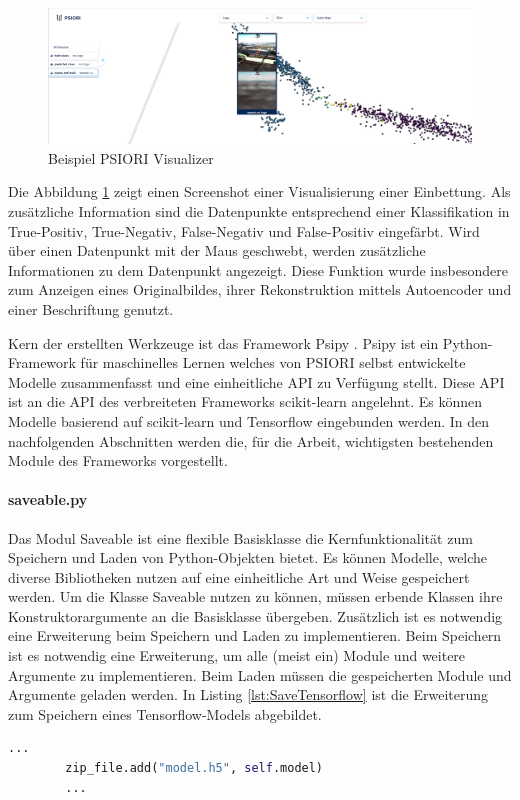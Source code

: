 	\begin{figure}[h]
		\centering
		\includegraphics[width=1\textwidth, center]{bilder/Grundlagen/Example_Visualizer.png}
		\caption[Beispiel PSIORI Visualizer]{Beispiel PSIORI Visualizer}
		\label{img:ExampleVisualizer}
	\end{figure}  
	Die Abbildung \ref{img:ExampleVisualizer} zeigt einen Screenshot einer Visualisierung einer Einbettung. Als zusätzliche Information sind die Datenpunkte entsprechend einer Klassifikation in True-Positiv, True-Negativ, False-Negativ und False-Positiv eingefärbt. Wird über einen Datenpunkt mit der Maus geschwebt, werden zusätzliche Informationen zu dem Datenpunkt angezeigt. Diese Funktion wurde insbesondere zum Anzeigen eines Originalbildes, ihrer Rekonstruktion mittels Autoencoder und einer Beschriftung genutzt. 
	
	Kern der erstellten Werkzeuge ist das Framework  Psipy \cite{PSIORIGmbH.2019}. Psipy ist ein Python-Framework für maschinelles Lernen welches von PSIORI selbst entwickelte Modelle zusammenfasst und eine einheitliche API zu Verfügung stellt. Diese API ist an die API des verbreiteten Frameworks scikit-learn angelehnt. Es können Modelle basierend auf scikit-learn  und Tensorflow eingebunden werden. In den nachfolgenden Abschnitten werden die, für die Arbeit, wichtigsten bestehenden Module des Frameworks vorgestellt.
	
	 \paragraph{saveable.py} Das Modul Saveable ist eine flexible Basisklasse die Kernfunktionalität zum Speichern und Laden von Python-Objekten bietet. Es können Modelle, welche diverse Bibliotheken nutzen auf eine einheitliche Art und Weise gespeichert werden. Um die Klasse Saveable nutzen zu können, müssen erbende Klassen ihre Konstruktorargumente an die Basisklasse übergeben. Zusätzlich ist es notwendig eine Erweiterung beim Speichern und Laden zu implementieren. Beim Speichern ist es notwendig eine Erweiterung, um alle (meist ein) Module und weitere Argumente zu implementieren. Beim Laden müssen die gespeicherten Module und Argumente geladen werden. In Listing \ref{lst:SaveTensorflow} ist die Erweiterung zum Speichern eines Tensorflow-Models abgebildet. 
	\begin{lstlisting}[language=python,caption=Erweiterung zum Speichern eines Tensorflow Models, label=lst:SaveTensorflow]
		...
		zip_file.add("model.h5", self.model)
		...
	\end{lstlisting}


